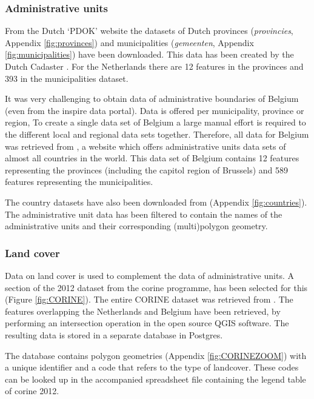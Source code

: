 \subsubsection{Administrative units}
\begin{sloppypar}
	From the Dutch `PDOK' website the datasets of Dutch provinces (\textit{provincies}, Appendix \ref{fig:provinces}) and municipalities (\textit{gemeenten}, Appendix \ref{fig:municipalities}) have been downloaded. This data has been created by the Dutch Cadaster \citep{DATA:Kadaster}. For the Netherlands there are 12 features in the provinces and 393 in the municipalities dataset. 
	
	It was very challenging to obtain data of administrative boundaries of Belgium (even from the \ac{inspire} data portal). Data is offered per municipality, province or region, To create a single  data set of Belgium a large manual effort is required to the different local and regional data sets together. Therefore, all data for Belgium was retrieved from \cite{DATA:GADM}, a website which offers administrative units data sets of almost all countries in the world. This data set of Belgium contains 12 features representing the provinces (including the capitol region of Brussels) and 589 features representing the municipalities.  
	
	The country datasets have also been downloaded from \cite{DATA:GADM} (Appendix \ref{fig:countries}). The administrative unit data has been filtered to contain the names of the administrative units and their corresponding (multi)polygon geometry. 
\end{sloppypar}

\subsubsection{Land cover}
\begin{sloppypar}
	Data on land cover is used to complement the data of administrative units. A section of the 2012 dataset from the \ac{corine} programme, has been selected for this (Figure \ref{fig:CORINE}). The entire CORINE dataset was retrieved from \cite{DATA:CLC}. The features overlapping the Netherlands and Belgium have been retrieved, by performing an intersection operation in the open source QGIS software. The resulting data is stored in a separate database in Postgres. 
	
	The database contains polygon geometries (Appendix \ref{fig:CORINEZOOM}) with a unique identifier and a code that refers to the type of landcover. These codes can be looked up in the accompanied spreadsheet file containing the legend table of \ac{corine} 2012.  	
\end{sloppypar}

